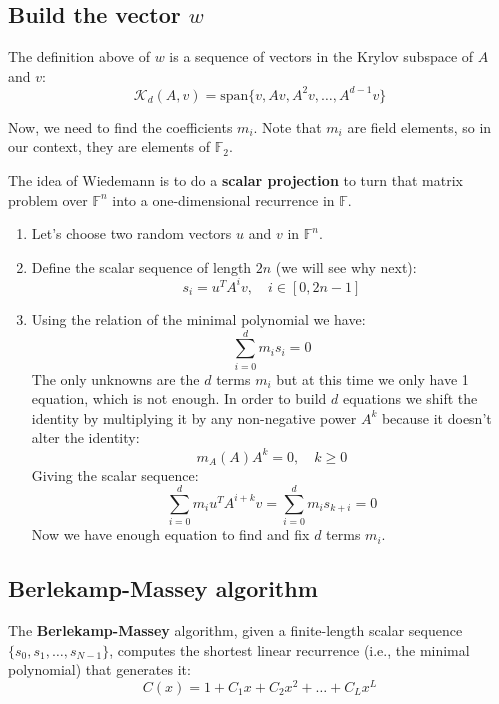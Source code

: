 \documentclass[a4paper, 11pt]{article}
\begin{document}
\subsection{Build the vector $w$}

The definition above of $w$ is a sequence of vectors in the Krylov subspace of $A$ and $v$:
\begin{equation}
    \mathcal{K}_d(A,v) = \mathrm{span}\{v, Av, A^2v, \dots, A^{d-1}v\}
\end{equation}

Now, we need to find the coefficients $m_i$. Note that $m_i$ are field elements, so in our context, they are elements of $\mathbb{F}_2$.

The idea of Wiedemann is to do a \textbf{scalar projection} to turn that matrix problem over $\mathbb{F}^n$ into a one-dimensional recurrence in $\mathbb{F}$.

\begin{enumerate}
    \item Let's choose two random vectors $u$ and $v$ in $\mathbb{F}^{n}$.
    \item Define the scalar sequence of length $2n$ (we will see why next): $$s_i = u^TA^iv, \quad i \in [0, 2n-1]$$
    \item Using the relation of the minimal polynomial we have:
    $$\sum^d_{i=0} m_i s_{i} = 0$$
    The only unknowns are the $d$ terms $m_i$ but at this time we only have 1 equation, which is not enough. In order to build $d$ equations we shift the identity by multiplying it by any non-negative power $A^k$ because it doesn't alter the identity:
    $$m_A(A)A^k=0, \quad k \ge 0$$
    Giving the scalar sequence:
    $$\sum^d_{i=0} m_i u^T A^{i+k}v = \sum^d_{i=0} m_i s_{k+i} = 0$$
    Now we have enough equation to find and fix $d$ terms $m_i$.
\end{enumerate}



\subsection{Berlekamp-Massey algorithm}

The \textbf{Berlekamp-Massey} algorithm, given a finite-length scalar sequence $\{s_0,s_1,\dots,s_{N-1}\}$, computes the shortest linear recurrence (i.e., the minimal polynomial) that generates it:
\begin{equation}
    C(x) = 1 + C_1x + C_2x^2 + \dots + C_Lx^L
\end{equation}
\end{document}
